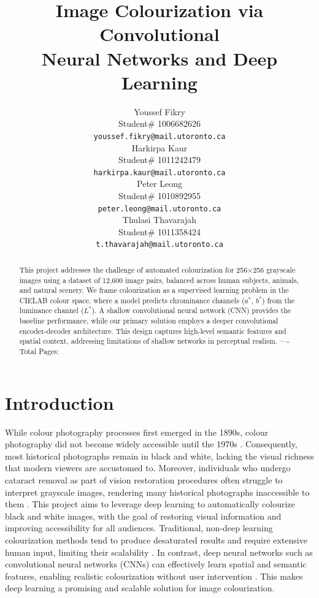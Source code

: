 \documentclass{article} %
\title{Image Colourization via Convolutional \\
Neural Networks and Deep Learning}
\author{Youssef Fikry  \\
Student\# 1006682626\\
\texttt{youssef.fikry@mail.utoronto.ca} \\
\And Harkirpa Kaur  \\
Student\# 1011242479 \\
\texttt{harkirpa.kaur@mail.utoronto.ca} \\
\AND
Peter Leong \\
Student\# 1010892955 \\
\texttt{peter.leong@mail.utoronto.ca} \\
\And
Thulasi Thavarajah \\
Student\# 1011358424 \\
\texttt{t.thavarajah@mail.utoronto.ca} \\
\AND
}
\begin{document}
\maketitle

\begin{abstract}
This project addresses the challenge of automated colourization for 256$\times$256 grayscale images using a dataset of 12,600 image pairs, balanced across human subjects, 
animals, and natural scenery. We frame colourization as a supervised learning problem in the CIELAB colour space, where a model predicts chrominance channels ($a^*$, $b^*$) 
from the luminance channel ($L^*$). A shallow convolutional neural network (CNN) provides the baseline performance, while our primary solution employs a deeper convolutional 
encoder-decoder architecture. This design captures high-level semantic features and spatial context, addressing limitations of shallow networks in perceptual realism.
----Total Pages: \pageref{last_page}
\end{abstract}

\section{Introduction}

While colour photography processes first emerged in the 1890s, colour photography did not become widely accessible until the 1970s \citep{scienceandmediamuseum2020}. 
Consequently, most historical photographs remain in black and white, lacking the visual richness that modern viewers are accustomed to. Moreover, individuals who undergo cataract 
removal as part of vision restoration procedures often struggle to interpret grayscale images, rendering many historical photographs inaccessible to them \citet{vogelsang2024impact}. 
This project aims to leverage deep learning to automatically colourize black and white images, with the goal of restoring visual information and improving accessibility for all audiences. 
Traditional, non-deep learning colourization methods tend to produce desaturated results and require extensive human input, limiting their scalability \citep{cheng2016deepcolorization}. 
In contrast, deep neural networks such as convolutional neural networks (CNNs) can effectively learn spatial and semantic features, enabling realistic colourization without user 
intervention \citep{zhang2016colorful}. This makes deep learning a promising and scalable solution for image colourization.
\end{document}
